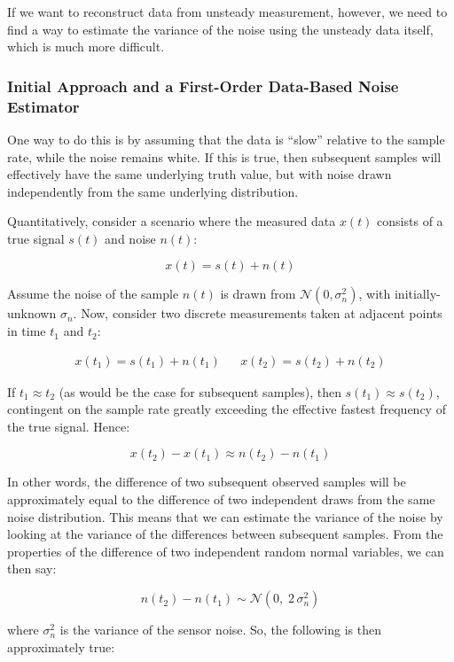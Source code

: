 If we want to reconstruct data from unsteady measurement, however, we need to find a way to estimate the variance of the noise using the unsteady data itself, which is much more difficult.

\subsubsection{Initial Approach and a First-Order Data-Based Noise Estimator}
\label{sec:sysid_first_order_noise_estimator}

One way to do this is by assuming that the data is ``slow'' relative to the sample rate, while the noise remains white. If this is true, then subsequent samples will effectively have the same underlying truth value, but with noise drawn independently from the same underlying distribution.

Quantitatively, consider a scenario where the measured data $x(t)$ consists of a true signal $s(t)$ and noise $n(t)$:

$$x(t) = s(t) + n(t)$$

Assume the noise of the sample $n(t)$ is drawn from $\mathcal{N}(0, \sigma^2_n)$, with initially-unknown $\sigma_n$. Now, consider two discrete measurements taken at adjacent points in time $t_1$ and $t_2$:

\begin{align*}
    x(t_1) = s(t_1) + n(t_1) &&
    x(t_2) = s(t_2) + n(t_2)
\end{align*}

\noindent If $t_1 \approx t_2$ (as would be the case for subsequent samples), then $s(t_1) \approx s(t_2)$, contingent on the sample rate greatly exceeding the effective fastest frequency of the true signal. Hence:

$$x(t_2) - x(t_1) \approx n(t_2) - n(t_1)$$

In other words, the difference of two subsequent observed samples will be approximately equal to the difference of two independent draws from the same noise distribution. This means that we can estimate the variance of the noise by looking at the variance of the differences between subsequent samples. From the properties of the difference of two independent random normal variables, we can then say:

$$n(t_2) - n(t_1) \sim \mathcal{N}(0,\; 2\, \sigma^2_n)$$

\noindent where $\sigma^2_n$ is the variance of the sensor noise. So, the following is then approximately true:

